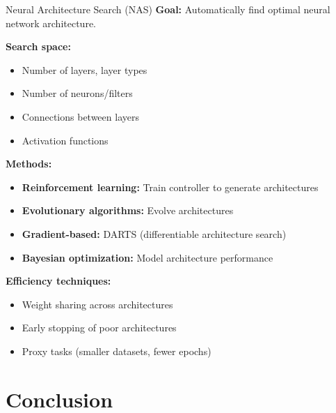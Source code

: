 \documentclass[aspectratio=169]{beamer}
\begin{document}
\begin{frame}{Neural Architecture Search (NAS)}
  \textbf{Goal:} Automatically find optimal neural network architecture.

  \vspace{0.5em}

  \textbf{Search space:}
  \begin{itemize}
    \item Number of layers, layer types
    \item Number of neurons/filters
    \item Connections between layers
    \item Activation functions
  \end{itemize}

  \vspace{0.5em}

  \textbf{Methods:}
  \begin{itemize}
    \item \textbf{Reinforcement learning:} Train controller to generate architectures
    \item \textbf{Evolutionary algorithms:} Evolve architectures
    \item \textbf{Gradient-based:} DARTS (differentiable architecture search)
    \item \textbf{Bayesian optimization:} Model architecture performance
  \end{itemize}

  \vspace{0.5em}

  \textbf{Efficiency techniques:}
  \begin{itemize}
    \item Weight sharing across architectures
    \item Early stopping of poor architectures
    \item Proxy tasks (smaller datasets, fewer epochs)
  \end{itemize}
\end{frame}

\section{Conclusion}
\end{document}
